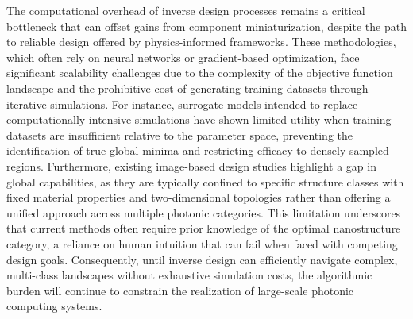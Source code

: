 \documentclass[11pt]{article}
\begin{document}
The computational overhead of inverse design processes remains a critical bottleneck that can offset gains from component miniaturization, despite the path to reliable design offered by physics-informed frameworks. These methodologies, which often rely on neural networks or gradient-based optimization, face significant scalability challenges due to the complexity of the objective function landscape and the prohibitive cost of generating training datasets through iterative simulations. For instance, surrogate models intended to replace computationally intensive simulations have shown limited utility when training datasets are insufficient relative to the parameter space, preventing the identification of true global minima and restricting efficacy to densely sampled regions. Furthermore, existing image-based design studies highlight a gap in global capabilities, as they are typically confined to specific structure classes with fixed material properties and two-dimensional topologies rather than offering a unified approach across multiple photonic categories. This limitation underscores that current methods often require prior knowledge of the optimal nanostructure category, a reliance on human intuition that can fail when faced with competing design goals. Consequently, until inverse design can efficiently navigate complex, multi-class landscapes without exhaustive simulation costs, the algorithmic burden will continue to constrain the realization of large-scale photonic computing systems. \citep{doi_10_1109_cleo_europe_eqec65582_2025_11110329_26a41a7d} \citep{doi_10_1002_adom_202100548_6789fa4c}
\end{document}
